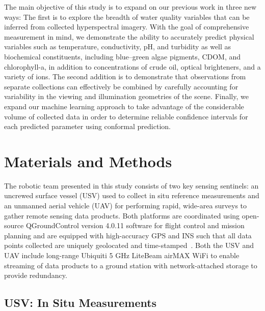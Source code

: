 \documentclass[remotesensing,article,accept,pdftex,moreauthors]{Definitions/mdpi}
\begin{document}
The main objective of this study is to expand on our previous work in three new ways: The first is to explore the breadth of water quality variables that can be inferred from collected hyperspectral imagery. With the goal of comprehensive measurement in mind, we demonstrate the ability to accurately predict physical variables such as temperature, conductivity, pH, and turbidity as well as biochemical constituents, including blue--green algae pigments, CDOM, and chlorophyll-a, in addition to concentrations of crude oil, optical brighteners, and a variety of ions. The second addition is to demonstrate that observations from separate collections can effectively be combined by carefully accounting for variability in the viewing and illumination geometries of the scene. Finally, we expand our machine learning approach to take advantage of the considerable volume of collected data in order to determine reliable confidence intervals for each predicted parameter using conformal prediction.




\section{Materials and Methods}

 The robotic team presented in this study consists of two key sensing sentinels: an uncrewed surface vessel (USV) used to collect in situ reference measurements and an unmanned aerial vehicle (UAV) for performing rapid, wide-area surveys to gather remote sensing data products. Both platforms are coordinated using open-source QGroundControl version 4.0.11 software for flight control and mission planning and are equipped with high-accuracy GPS and INS such that all data points collected are uniquely geolocated and time-stamped~\cite{qgroundcontrol}. Both the USV and UAV include long-range Ubiquiti 5 GHz LiteBeam airMAX WiFi to enable streaming of data products to a ground station with network-attached storage to provide redundancy.

\subsection{USV: In Situ Measurements}
\end{document}
